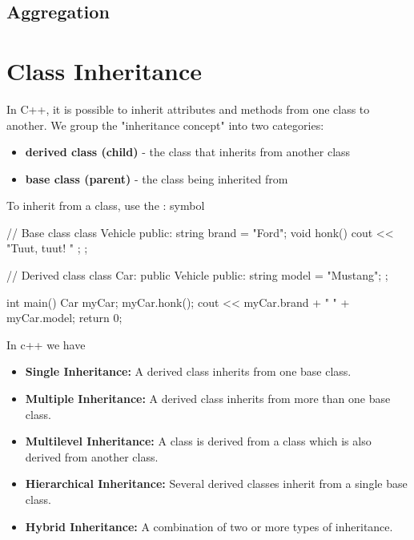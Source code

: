 \documentclass{report}
\begin{document}
    \bigbreak \noindent 
    \subsection{Aggregation}
    \bigbreak \noindent 



    \pagebreak \bigbreak \noindent 
    \section{Class Inheritance}
    \bigbreak \noindent 
    \begin{concept}
       In C++, it is possible to inherit attributes and methods from one class to another. We group the "inheritance concept" into two categories:
       \begin{itemize}
           \item \textbf{derived class (child)} - the class that inherits from another class
           \item \textbf{base class (parent)} - the class being inherited from
       \end{itemize}
       To inherit from a class, use the : symbol
    \end{concept}
    \bigbreak \noindent 
    \begin{cppcode}
// Base class
class Vehicle {
  public:
    string brand = "Ford";
    void honk() {
      cout << "Tuut, tuut! \n" ;
    }
};

// Derived class
class Car: public Vehicle {
  public:
    string model = "Mustang";
};

int main() {
  Car myCar;
  myCar.honk();
  cout << myCar.brand + " " + myCar.model;
  return 0;
}
    \end{cppcode}
    \bigbreak \noindent 
    In c++ we have
    \begin{itemize}
        \item \textbf{Single Inheritance:} A derived class inherits from one base class.
        \item \textbf{Multiple Inheritance:} A derived class inherits from more than one base class.
        \item \textbf{Multilevel Inheritance:} A class is derived from a class which is also derived from another class.
        \item \textbf{Hierarchical Inheritance:} Several derived classes inherit from a single base class.
        \item \textbf{Hybrid Inheritance:} A combination of two or more types of inheritance.
    \end{itemize}
\end{document}
